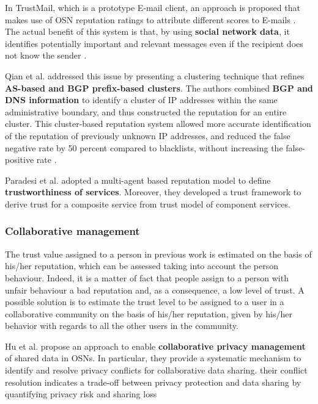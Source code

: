 In TrustMail,
	which is a prototype E-mail client,
	an approach is proposed that makes use of OSN reputation ratings to attribute different scores to E-mails \cite{golbeck_reputation_2004}.
The actual benefit of this system is that,
	by using \textbf{social network data},
	it identifies potentially important and relevant messages even if the recipient does not know the sender \cite{golbeck_reputation_2004}.

Qian et al. \cite{qian_networklevel_2010} addressed this issue by presenting a clustering technique that refines \textbf{AS-based and BGP prefix-based clusters}.
The authors combined \textbf{BGP and DNS information} to identify a cluster of IP addresses within the same administrative boundary,
	and thus constructed the reputation for an entire cluster.
This cluster-based reputation system allowed more accurate identification of the reputation of previously unknown IP addresses,
	and reduced the false negative rate by 50 percent compared to blacklists,
	without increasing the false-positive rate \cite{qian_networklevel_2010}.

Paradesi et al. \cite{paradesi_integrating_2009} adopted a multi-agent based reputation model to define \textbf{trustworthiness of services}.
Moreover,
	they developed a trust framework to derive trust for a composite service from trust model of component services.

\subsubsection{Collaborative management}


The trust value assigned to a person in previous work is estimated on the basis of his/her reputation,
	which can be assessed taking into account the person behaviour.
Indeed,
	it is a matter of fact that people assign to a person with unfair behaviour a bad reputation and,
	as a consequence,
	a low level of trust.
A possible solution is to estimate the trust level to be assigned to a user in a collaborative community on the basis of his/her reputation,
	given by his/her behavior with regards to all the other users in the community.

Hu et al. \cite{hu_detecting_2011} propose an approach to enable \textbf{collaborative privacy management} of shared data in OSNs.
In particular,
	they provide a systematic mechanism to identify and resolve privacy conflicts for collaborative data sharing.
their conflict resolution indicates a trade-off between privacy protection and data sharing by quantifying privacy risk and sharing loss

